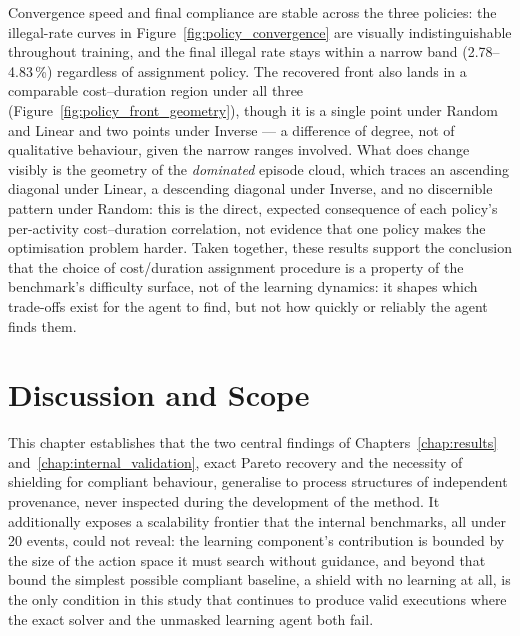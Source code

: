 Convergence speed and final compliance are stable across the three
policies: the illegal-rate curves in
Figure~\ref{fig:policy_convergence} are visually indistinguishable
throughout training, and the final illegal rate stays within a narrow
band (2.78--4.83\,\%) regardless of assignment policy. The recovered
front also lands in a comparable cost--duration region under all three
(Figure~\ref{fig:policy_front_geometry}), though it is a single point
under Random and Linear and two points under Inverse --- a difference
of degree, not of qualitative behaviour, given the narrow ranges
involved. What does change visibly is the geometry of the
\emph{dominated} episode cloud, which traces an ascending diagonal under
Linear, a descending diagonal under Inverse, and no discernible pattern
under Random: this is the direct, expected consequence of each policy's
per-activity cost--duration correlation, not evidence that one policy
makes the optimisation problem harder. Taken together, these results
support the conclusion that the choice of cost/duration assignment
procedure is a property of the benchmark's difficulty surface, not of
the learning dynamics: it shapes which trade-offs exist for the agent to
find, but not how quickly or reliably the agent finds them.

\section{Discussion and Scope}
\label{sec:external_discussion}

This chapter establishes that the two central findings of
Chapters~\ref{chap:results} and~\ref{chap:internal_validation}, exact
Pareto recovery and the necessity of shielding for compliant behaviour,
generalise to process structures of independent provenance, never
inspected during the development of the method. It additionally
exposes a scalability frontier that the internal benchmarks, all under
20 events, could not reveal: the learning component's contribution is
bounded by the size of the action space it must search without
guidance, and beyond that bound the simplest possible compliant
baseline, a shield with no learning at all, is the only condition in
this study that continues to produce valid executions where the exact
solver and the unmasked learning agent both fail.

